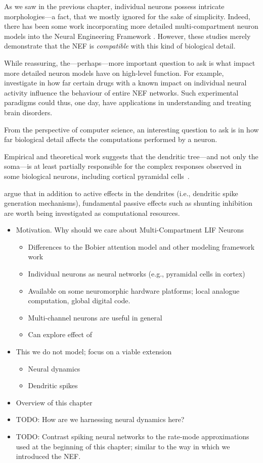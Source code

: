 As we saw in the previous chapter, individual neurons possess intricate morphologies---a fact, that we mostly ignored for the sake of simplicity.
Indeed, there has been some work incorporating more detailed multi-compartment neuron models into the Neural Engineering Framework \citep{eliasmith2016biospaun,duggins2017incorporating}.
However, these studies merely demonstrate that the NEF is \emph{compatible} with this kind of biological detail.

While reassuring, the---perhaps---more important question to ask is what impact more detailed neuron models have on high-level function.
For example, \citet{duggins2017effects} investigate in how far certain drugs with a known impact on individual neural activity influence the behaviour of entire NEF networks.
Such experimental paradigms could thus, one day, have applications in understanding and treating brain disorders.

From the perspective of computer science, an interesting question to ask is in how far biological detail affects the computations performed by a neuron.

Empirical and theoretical work suggests that the dendritic tree---and not only the soma---is at least partially responsible for the complex responses observed in some biological neurons, including cortical pyramidal cells~\citep{mel1994information,polsky2004computational}.

\citet{london2005dendritic} argue that in addition to active effects in the dendrites (i.e., dendritic spike generation mechanisms), fundamental passive effects such as shunting inhibition are worth being investigated as computational resources.


\begin{itemize}
	\item Motivation. Why should we care about Multi-Compartment LIF Neurons
	\begin{itemize}
		\item Differences to the Bobier attention model and other modeling framework work
		\item Individual neurons as neural networks (e.g., pyramidal cells in cortex)
		\item Available on some neuromorphic hardware platforms; local analogue computation, global digital code.
		\item Multi-channel neurons are useful in general
		\item Can explore effect of 
	\end{itemize}
	\item This we do not model; focus on a viable extension
	\begin{itemize}
		\item Neural dynamics
		\item Dendritic spikes
	\end{itemize}
	\item Overview of this chapter
	\item TODO: How are we harnessing neural dynamics here?
	\item TODO: Contrast spiking neural networks to the rate-mode approximations used at the beginning of this chapter; similar to the way in which we introduced the NEF.
\end{itemize}

